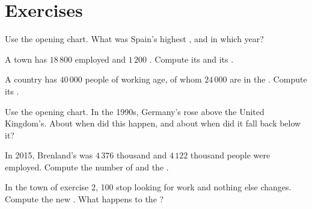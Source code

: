 \section{Exercises}

\begin{exercise}[$\star$]\label{exo:g8:jobs-wages-unemployment:1}
Use the opening chart. What was Spain's highest , and in which year?
\end{exercise}

\begin{exercise}[$\star$]\label{exo:g8:jobs-wages-unemployment:2}
A town has $18\,800$ employed and $1\,200$ . Compute its  and its
.
\end{exercise}

\begin{exercise}[$\star$]\label{exo:g8:jobs-wages-unemployment:3}
A country has $40\,000$ people of working age, of whom $24\,000$ are in the . Compute
its .
\end{exercise}

\begin{exercise}[$\star$]\label{exo:g8:jobs-wages-unemployment:4}
Use the opening chart. In the 1990s, Germany's  rose above the United Kingdom's.
About when did this happen, and about when did it fall back below it?
\end{exercise}

\begin{exercise}[$\star\star$]\label{exo:g8:jobs-wages-unemployment:5}
In 2015, Brenland's  was $4\,376$ thousand and $4\,122$ thousand people were employed.
Compute the number of  and the .
\end{exercise}

\begin{exercise}[$\star\star$]\label{exo:g8:jobs-wages-unemployment:6}
In the town of exercise 2, 100  stop looking for work and nothing else changes.
Compute the new . What happens to the ?
\end{exercise}

